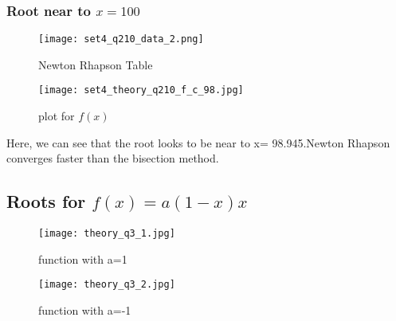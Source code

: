 \documentclass[a4paper]{article}
\begin{document}
    \subsubsection{Root near to $x=100$}
    \begin{figure}[!htbp]
    \centering
      \begin{minipage}[b]{0.45\textwidth}
        \texttt{[image: set4\_q210\_data\_2.png]}
                \caption{Newton Rhapson Table }
              \end{minipage}
              \hfill
              \begin{minipage}[b]{0.45\textwidth}
                \texttt{[image: set4\_theory\_q210\_f\_c\_98.jpg]}
                \caption{plot for $f(x)$}
              \end{minipage}
            \end{figure}
             \large{Here, we can see that the root looks to be near to x= 98.945.Newton Rhapson converges faster than the bisection method.}
                \newpage
    \subsection{Roots for $f(x)=a(1-x)x$}
        
     \begin{figure}[!htbp]
          \centering
          \begin{minipage}[b]{0.45\textwidth}
\texttt{[image: theory\_q3\_1.jpg]}
            \caption{function with a=1}
          \end{minipage}
          \hfill
          \begin{minipage}[b]{0.45\textwidth}
        \texttt{[image: theory\_q3\_2.jpg]}
            \caption{function with a=-1}
          \end{minipage}
        \end{figure}
\end{document}
